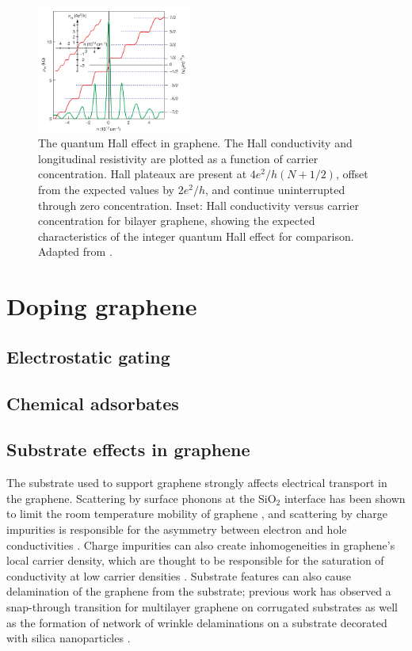 \documentclass[edeposit,fullpage,draftthesis]{uiucthesis2009}
\begin{document}
    \begin{figure}
    \centering
    \includegraphics[width=0.45\textwidth]{images/background/QHEinG.png}
    \caption[The quantum Hall effect in graphene]{The quantum Hall effect in graphene. The Hall conductivity and longitudinal resistivity are plotted as a function of carrier concentration. Hall plateaux are present at $4 e^2 / h (N + 1/2)$, offset from the expected values by $2 e^2 / h$, and continue uninterrupted through zero concentration. Inset: Hall conductivity versus carrier concentration for bilayer graphene, showing the expected characteristics of the integer quantum Hall effect for comparison. Adapted from \cite{Novoselov2005}.}
    \label{fig:QHEinG}
    \end{figure}

        
    \section{Doping graphene}
    
        \subsection{Electrostatic gating}
        
        \subsection{Chemical adsorbates}
    
        \subsection{Substrate effects in graphene}
        The substrate used to support graphene strongly affects electrical transport in the graphene. Scattering by surface phonons at the SiO$_2$ interface has been shown to limit the room temperature mobility of graphene \cite{Chen2008}, and scattering by charge impurities is responsible for the asymmetry between electron and hole conductivities \cite{Hwang2007}. Charge impurities can also create inhomogeneities in graphene's local carrier density, which are thought to be responsible for the saturation of conductivity at low carrier densities \cite{Hwang2007}. Substrate features can also cause delamination of the graphene from the substrate; previous work has observed a snap-through transition for multilayer graphene on corrugated substrates \cite{Scharfenberg2012} as well as the formation of network of wrinkle delaminations on a substrate decorated with silica nanoparticles \cite{Yamamoto2012}.
    
\end{document}
